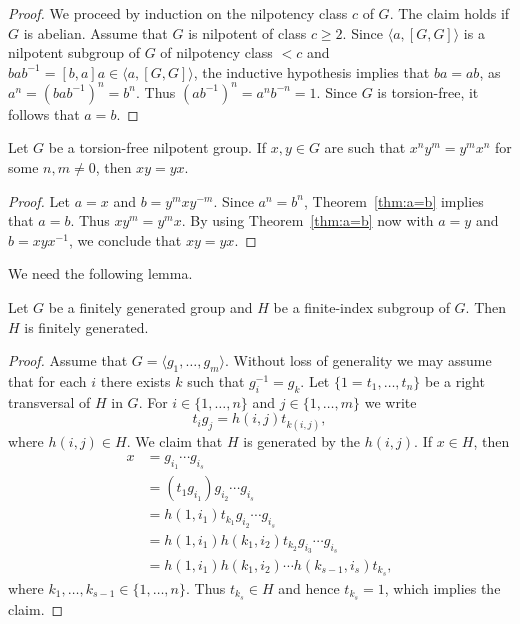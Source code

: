 \begin{proof}
	We proceed by induction on the nilpotency class $c$ of $G$. The claim holds if $G$ is abelian. Assume 
	that $G$ is nilpotent of class $c\geq2$. Since $\langle a,[G,G]\rangle$ is a nilpotent subgroup of
	$G$ of nilpotency class $<c$ and $bab^{-1}=[b,a]a\in \langle
	a,[G,G]\rangle$, the inductive hypothesis implies that $ba=ab$, as  
	$a^n=(bab^{-1})^n=b^n$. Thus $(ab^{-1})^n=a^nb^{-n}=1$. Since $G$ is torsion-free, it follows that $a=b$.
\end{proof}

\begin{corollary}
	Let $G$ be a torsion-free nilpotent group. If $x,y\in G$ are such that 
	$x^ny^m=y^mx^n$ for some $n,m\ne 0$, then $xy=yx$.
\end{corollary}

\begin{proof}
	Let $a=x$ and $b=y^mxy^{-m}$. Since $a^n=b^n$, Theorem~\ref{thm:a=b} implies that $a=b$. Thus $xy^m=y^mx$. 
	By using Theorem~\ref{thm:a=b} now with $a=y$ and $b=xyx^{-1}$, we conclude that 
	$xy=yx$. 
\end{proof}

We need the following lemma. 

\begin{lemma}
	\label{lem:fg}
	Let $G$ be a finitely generated group and $H$ be a finite-index subgroup of $G$. 
	Then $H$ is finitely generated. 
\end{lemma}

\begin{proof}
	Assume that $G=\langle g_1,\dots,g_m\rangle$. Without loss of generality we may assume that 
	for each $i$ there exists $k$ such that $g_i^{-1}=g_k$. 
	Let $\{1=t_1,\dots,t_n\}$ be a right transversal of $H$ in $G$. For 
	$i\in\{1,\dots,n\}$ and 
	$j\in\{1,\dots,m\}$ we write 
	\[
		t_ig_j=h(i,j)t_{k(i,j)},
	\]
	where $h(i,j)\in H$.
	We claim that $H$ is generated by the $h(i,j)$. If $x\in H$, then 
	\begin{align*}
	x &=g_{i_1}\cdots g_{i_s}\\
	&= (t_1g_{i_1})g_{i_2}\cdots g_{i_s}\\
	&= h(1,i_1)t_{k_1}g_{i_2}\cdots g_{i_s}\\
	&= h(1,i_1)h(k_1,i_2)t_{k_2}g_{i_3}\cdots g_{i_s}\\
	&= h(1,i_1)h(k_1,i_2)\cdots h(k_{s-1},i_s)t_{k_s},
	\end{align*}
	where $k_1,\dots,k_{s-1}\in\{1,\dots,n\}$. Thus $t_{k_s}\in H$ and hence 
	$t_{k_s}=1$, which implies the claim.  
\end{proof}

